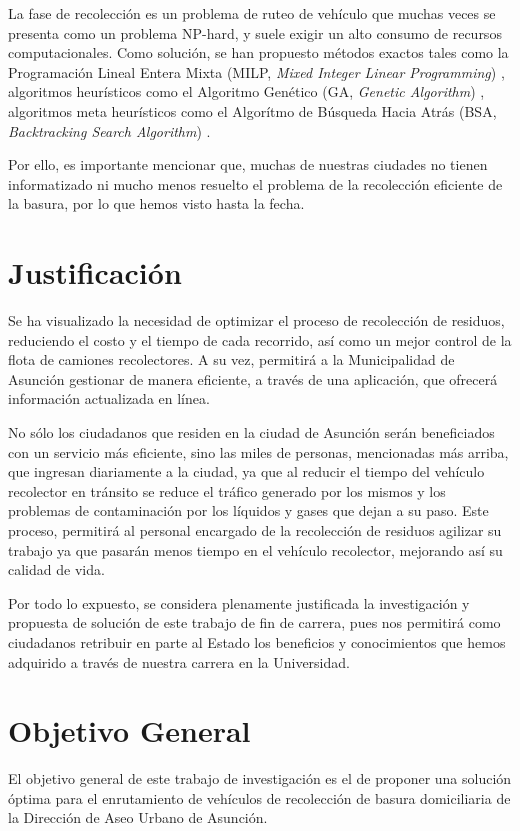 La fase de recolección es un problema de ruteo de vehículo que muchas veces se presenta como un problema NP-hard, y suele exigir un alto consumo de recursos computacionales. Como solución, se han propuesto métodos exactos tales como la Programación Lineal Entera Mixta (MILP, \textit{Mixed Integer Linear Programming}) \citep{Vecchi2016ACollection}, algoritmos heurísticos como el Algoritmo Genético (GA, \textit{Genetic Algorithm}) \citep{Mohammed2017SolvingSolution}, algoritmos meta heurísticos como el Algorítmo de Búsqueda Hacia Atrás (BSA, \textit{Backtracking Search Algorithm}) \citep{Akhtar2017BacktrackingOptimization}.



Por ello, es importante mencionar que, muchas de nuestras ciudades no tienen informatizado ni mucho menos resuelto el problema de la recolección eficiente de la basura, por lo que hemos visto hasta la fecha.

\section{Justificación}
Se ha visualizado la necesidad de optimizar el proceso de recolección de residuos, reduciendo el costo y el tiempo de cada recorrido, así como un mejor control de la flota de camiones recolectores. A su vez, permitirá a la Municipalidad de Asunción gestionar de manera eficiente, a través de una aplicación, que ofrecerá información actualizada en línea.

No sólo los ciudadanos que residen en la ciudad de Asunción serán beneficiados con un servicio más eficiente, sino las miles de personas, mencionadas más arriba, que ingresan diariamente a la ciudad, ya que al reducir el tiempo del vehículo recolector en tránsito se reduce el tráfico generado por los mismos y los problemas de contaminación por los líquidos y gases que dejan a su paso.
Este proceso, permitirá al personal encargado de la recolección de residuos agilizar su trabajo ya que pasarán menos tiempo en el vehículo recolector, mejorando así su calidad de vida.

Por todo lo expuesto, se considera plenamente justificada la investigación y propuesta de solución de este trabajo de fin de carrera, pues nos permitirá como ciudadanos retribuir en parte al Estado los beneficios y conocimientos que hemos adquirido a través de nuestra carrera en la Universidad.

\section{Objetivo General}
El objetivo general de este trabajo de investigación es el de proponer una solución óptima para el enrutamiento de vehículos de recolección de basura domiciliaria de la Dirección de Aseo Urbano de Asunción.

